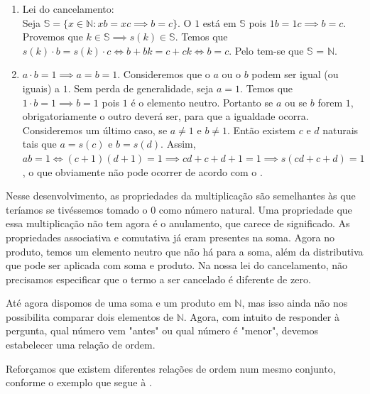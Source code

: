 \documentclass[../main.tex]{subfiles}
\begin{document}
\begin{dem}
\begin{enumerate}[label=(\roman*)]
            
            
        \item Lei do cancelamento: \\
            Seja $\mathbb{S} = \{ x \in \mathbb{N} : xb = xc \implies b = c\}$. O $1$ está em $\mathbb{S}$ pois $1b = 1c \implies b = c$. Provemos que $k\in \mathbb{S} \implies s(k) \in \mathbb{S}$. Temos que $s(k) \cdot b = s(k) \cdot c \iff b + bk = c + ck \iff b = c$. Pelo  tem-se que $\mathbb{S}$ = $\mathbb{N}$.
        \item $a \cdot b = 1 \implies a = b = 1$.
            Consideremos que o $a$ ou o $b$ podem ser igual (ou iguais) a $1$.
            Sem perda de generalidade, seja $a = 1$. Temos que $1 \cdot b = 1 \implies b = 1$ pois $1$ é o elemento neutro. Portanto se $a$ ou se $b$ forem $1$, obrigatoriamente o outro deverá ser, para que a igualdade ocorra.
            Consideremos um último caso, se $a \neq 1$ e $ b \neq 1$. Então existem $c$ e $d$ naturais tais que $a = s(c)$ e $b = s(d)$.
            Assim, $ab=1 \iff (c+1) (d+1) = 1 \implies cd + c + d + 1 = 1 \implies s(cd + c + d) = 1$, o que obviamente não pode ocorrer de acordo com o  .
    \end{enumerate}
\end{dem}

Nesse desenvolvimento, as propriedades da multiplicação são semelhantes às que teríamos se tivéssemos tomado o $0$ como número natural. Uma propriedade que essa multiplicação não tem agora é o anulamento, que carece de significado. As propriedades associativa e comutativa já eram presentes na soma. Agora no produto, temos um elemento neutro que não há para a soma, além da distributiva que pode ser aplicada com soma e produto.
Na nossa lei do cancelamento, não precisamos especificar que o termo a ser cancelado é diferente de zero.


Até agora dispomos de uma soma e um produto em $\mathbb{N}$, mas isso ainda não nos possibilita comparar dois elementos de $\mathbb{N}$. Agora, com intuito de responder à pergunta, qual número vem "antes" ou qual número é "menor", devemos estabelecer uma relação de ordem. 

Reforçamos que existem diferentes relações de ordem num mesmo conjunto, conforme o exemplo que segue à .
\end{document}
